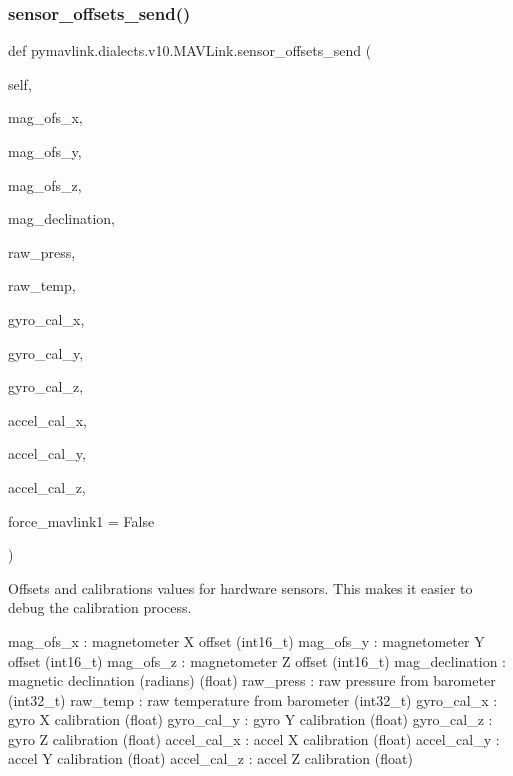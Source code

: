 \begin{DoxyVerb}
\begin{DoxyVerb}
\begin{DoxyVerb}
\begin{DoxyVerb}
\begin{DoxyVerb}
\begin{DoxyVerb}
\begin{DoxyVerb}
\begin{DoxyVerb}
\begin{DoxyVerb}
\begin{DoxyVerb}
\subsubsection{\texorpdfstring{sensor\+\_\+offsets\+\_\+send()}{sensor\_offsets\_send()}}
{\footnotesize\ttfamily def pymavlink.\+dialects.\+v10.\+M\+A\+V\+Link.\+sensor\+\_\+offsets\+\_\+send (\begin{DoxyParamCaption}\item[{}]{self,  }\item[{}]{mag\+\_\+ofs\+\_\+x,  }\item[{}]{mag\+\_\+ofs\+\_\+y,  }\item[{}]{mag\+\_\+ofs\+\_\+z,  }\item[{}]{mag\+\_\+declination,  }\item[{}]{raw\+\_\+press,  }\item[{}]{raw\+\_\+temp,  }\item[{}]{gyro\+\_\+cal\+\_\+x,  }\item[{}]{gyro\+\_\+cal\+\_\+y,  }\item[{}]{gyro\+\_\+cal\+\_\+z,  }\item[{}]{accel\+\_\+cal\+\_\+x,  }\item[{}]{accel\+\_\+cal\+\_\+y,  }\item[{}]{accel\+\_\+cal\+\_\+z,  }\item[{}]{force\+\_\+mavlink1 = {\ttfamily False} }\end{DoxyParamCaption})}

\begin{DoxyVerb}Offsets and calibrations values for hardware sensors. This makes it
easier to debug the calibration process.

mag_ofs_x                 : magnetometer X offset (int16_t)
mag_ofs_y                 : magnetometer Y offset (int16_t)
mag_ofs_z                 : magnetometer Z offset (int16_t)
mag_declination           : magnetic declination (radians) (float)
raw_press                 : raw pressure from barometer (int32_t)
raw_temp                  : raw temperature from barometer (int32_t)
gyro_cal_x                : gyro X calibration (float)
gyro_cal_y                : gyro Y calibration (float)
gyro_cal_z                : gyro Z calibration (float)
accel_cal_x               : accel X calibration (float)
accel_cal_y               : accel Y calibration (float)
accel_cal_z               : accel Z calibration (float)\end{DoxyVerb}
 \mbox{\label{classpymavlink_1_1dialects_1_1v10_1_1MAVLink_adcce854e40e5ac1fec5b82c989efea4c}} 

\end{DoxyVerb}
\end{DoxyVerb}
\end{DoxyVerb}
\end{DoxyVerb}
\end{DoxyVerb}
\end{DoxyVerb}
\end{DoxyVerb}
\end{DoxyVerb}
\end{DoxyVerb}
\end{DoxyVerb}
